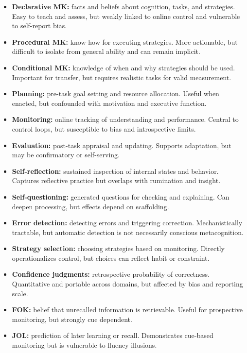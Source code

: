 \documentclass{book}
\begin{document}
   \begin{itemize}
      \item \textbf{Declarative MK:} facts and beliefs about cognition, tasks, and strategies. Easy to teach and assess, but weakly linked to online control and vulnerable to self-report bias.
      \item \textbf{Procedural MK:} know-how for executing strategies. More actionable, but difficult to isolate from general ability and can remain implicit.
      \item \textbf{Conditional MK:} knowledge of when and why strategies should be used. Important for transfer, but requires realistic tasks for valid measurement.
      \item \textbf{Planning:} pre-task goal setting and resource allocation. Useful when enacted, but confounded with motivation and executive function.
      \item \textbf{Monitoring:} online tracking of understanding and performance. Central to control loops, but susceptible to bias and introspective limits.
      \item \textbf{Evaluation:} post-task appraisal and updating. Supports adaptation, but may be confirmatory or self-serving.
      \item \textbf{Self-reflection:} sustained inspection of internal states and behavior. Captures reflective practice but overlaps with rumination and insight.
      \item \textbf{Self-questioning:} generated questions for checking and explaining. Can deepen processing, but effects depend on scaffolding.
      \item \textbf{Error detection:} detecting errors and triggering correction. Mechanistically tractable, but automatic detection is not necessarily conscious metacognition.
      \item \textbf{Strategy selection:} choosing strategies based on monitoring. Directly operationalizes control, but choices can reflect habit or constraint.
      \item \textbf{Confidence judgments:} retrospective probability of correctness. Quantitative and portable across domains, but affected by bias and reporting scale.
      \item \textbf{FOK:} belief that unrecalled information is retrievable. Useful for prospective monitoring, but strongly cue dependent.
      \item \textbf{JOL:} prediction of later learning or recall. Demonstrates cue-based monitoring but is vulnerable to fluency illusions.

\end{itemize}
\end{document}
